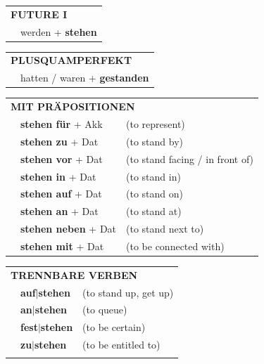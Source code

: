 \documentclass[10pt,a4paper]{revtex4-2}
\begin{document}
\begin{verbbox}
\begin{tabular}{rl}
    \multicolumn{2}{l}{\textbf{FUTURE I} }\\
  &  werden + \textbf{stehen}\\
 
  \end{tabular}
\hfill
   \begin{tabular}{rl}
      \multicolumn{2}{l}{\textbf{PLUSQUAMPERFEKT}}\\
  &  hatten / waren + \textbf{gestanden}\\
  \end{tabular}

   \vspace{10pt}

   \begin{tabular}{lll}
      \multicolumn{3}{l}{\textbf{MIT PRÄPOSITIONEN}}\\
& \textbf{stehen für} + Akk & (to represent)\\
& \textbf{stehen zu} + Dat & (to stand by)\\
&\textbf{stehen vor} + Dat & (to stand facing / in front of)\\
&\textbf{stehen in} + Dat & (to stand in)\\
&\textbf{stehen auf} + Dat & (to stand on)\\
&\textbf{stehen an} + Dat & (to stand at)\\
&\textbf{stehen neben} + Dat & (to stand next to)\\
&\textbf{stehen mit} + Dat & (to be connected with)\\
  \end{tabular}
  \hfill
   \begin{tabular}{lll}
      \multicolumn{3}{l}{\textbf{TRENNBARE VERBEN}}\\
 & \textbf{auf$|$stehen} & (to stand up, get up)\\
 & \textbf{an$|$stehen} & (to queue)\\
     & \textbf{fest$|$stehen} & (to be certain)\\
     & \textbf{zu$|$stehen} & (to be entitled to)\\
\vspace{40pt}
  \end{tabular}


  \vspace{-5pt}


\end{verbbox}
\end{document}

